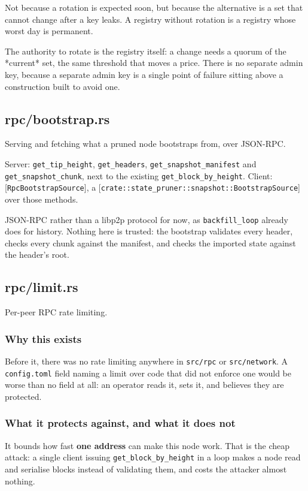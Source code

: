 \documentclass[11pt,a4paper]{article}
\begin{document}
Not because a rotation is expected soon, but because the alternative is a
set that cannot change after a key leaks. A registry without rotation is a
registry whose worst day is permanent.

The authority to rotate is the registry itself: a change needs a quorum of
the *current* set, the same threshold that moves a price. There is no
separate admin key, because a separate admin key is a single point of
failure sitting above a construction built to avoid one.

\subsection{rpc/bootstrap.rs}
Serving and fetching what a pruned node bootstraps from, over JSON-RPC.

Server: \texttt{get\_tip\_height}, \texttt{get\_headers}, \texttt{get\_snapshot\_manifest} and
\texttt{get\_snapshot\_chunk}, next to the existing \texttt{get\_block\_by\_height}.
Client: [\texttt{RpcBootstrapSource}], a
[\texttt{crate::state\_pruner::snapshot::BootstrapSource}] over those methods.

JSON-RPC rather than a libp2p protocol for now, as \texttt{backfill\_loop} already
does for history. Nothing here is trusted: the bootstrap validates every
header, checks every chunk against the manifest, and checks the imported
state against the header's root.

\subsection{rpc/limit.rs}
Per-peer RPC rate limiting.

\subsubsection{Why this exists}

Before it, there was no rate limiting anywhere in \texttt{src/rpc} or
\texttt{src/network}. A \texttt{config.toml} field naming a limit over code that did not
enforce one would be worse than no field at all: an operator reads it, sets
it, and believes they are protected.

\subsubsection{What it protects against, and what it does not}

It bounds how fast \textbf{one address} can make this node work. That is the
cheap attack: a single client issuing \texttt{get\_block\_by\_height} in a loop makes
a node read and serialise blocks instead of validating them, and costs the
attacker almost nothing.
\end{document}
